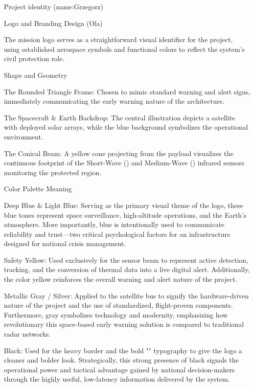 Project identity (name:Grzegorz) 

 

Logo and Branding Design (Ola) 

The  mission logo serves as a straightforward visual identifier for the project, using established aerospace symbols and functional colors to reflect the system's civil protection role. 

 

Shape and Geometry 

    The Rounded Triangle Frame: Chosen to mimic standard warning and alert signs, immediately communicating the early warning nature of the architecture. 

    The Spacecraft \& Earth Backdrop: The central illustration depicts a satellite with deployed solar arrays, while the blue background symbolizes the operational environment. 

    The Conical Beam: A yellow cone projecting from the payload visualizes the continuous footprint of the Short-Wave () and Medium-Wave () infrared sensors monitoring the protected region. 

Color Palette Meaning 

    Deep Blue \& Light Blue: Serving as the primary visual theme of the logo, these blue tones represent space surveillance, high-altitude operations, and the Earth's atmosphere. More importantly, blue is intentionally used to communicate reliability and trust—two critical psychological factors for an infrastructure designed for national crisis management. 

    Safety Yellow: Used exclusively for the sensor beam to represent active detection, tracking, and the conversion of thermal data into a live digital alert. Additionally, the color yellow reinforces the overall warning and alert nature of the project. 

    Metallic Gray / Silver: Applied to the satellite bus to signify the hardware-driven nature of the project and the use of standardized, flight-proven components. Furthermore, gray symbolizes technology and modernity, emphasizing how revolutionary this space-based early warning solution is compared to traditional radar networks. 

    Black: Used for the heavy border and the bold "" typography to give the logo a cleaner and bolder look. Strategically, this strong presence of black signals the operational power and tactical advantage gained by national decision-makers through the highly useful, low-latency information delivered by the system. 